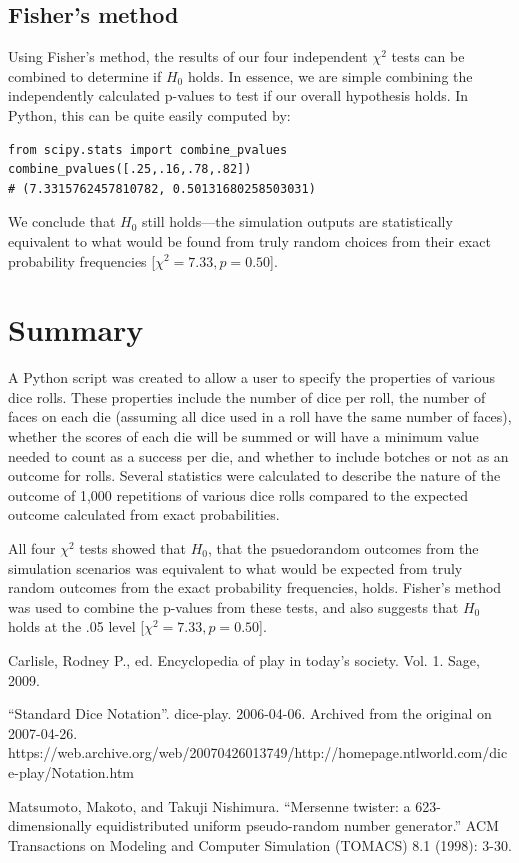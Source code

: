 \documentclass{article}
\begin{document}
\subsection{Fisher's method}

Using Fisher's method, the results of our four independent $\chi^2$ tests can be combined to determine if $H_0$ holds. In essence, we are simple combining the independently calculated p-values to test if our overall hypothesis holds. In Python, this can be quite easily computed by:
\\
\begin{lstlisting}
from scipy.stats import combine_pvalues
combine_pvalues([.25,.16,.78,.82])
# (7.3315762457810782, 0.50131680258503031)
\end{lstlisting}
We conclude that $H_0$ still holds---the simulation outputs are statistically equivalent to what would be found from truly random choices from their exact probability frequencies [$\chi^2=7.33, p=0.50$].

\section{Summary}
A Python script was created to allow a user to specify the properties of various dice rolls. These properties include the number of dice per roll, the number of faces on each die (assuming all dice used in a roll have the same number of faces), whether the scores of each die will be summed or will have a minimum value needed to count as a success per die, and whether to include botches or not as an outcome for rolls. Several statistics were calculated to describe the nature of the outcome of 1,000 repetitions of various dice rolls compared to the expected outcome calculated from exact probabilities.

All four $\chi^2$ tests showed that $H_0$, that the psuedorandom outcomes from the simulation scenarios was equivalent to what would be expected from truly random outcomes from the exact probability frequencies, holds. Fisher's method was used to combine the p-values from these tests, and also suggests that $H_0$ holds at the .05 level [$\chi^2=7.33, p=0.50$].


%
\begin{thebibliography}{1}

Carlisle, Rodney P., ed. Encyclopedia of play in today's society. Vol. 1. Sage, 2009.

``Standard Dice Notation''. dice-play. 2006-04-06. Archived from the original on 2007-04-26. https://web.archive.org/web/20070426013749/http://homepage.ntlworld.com/dice-play/Notation.htm

Matsumoto, Makoto, and Takuji Nishimura. ``Mersenne twister: a 623-dimensionally equidistributed uniform pseudo-random number generator.'' ACM Transactions on Modeling and Computer Simulation (TOMACS) 8.1 (1998): 3-30.

\end{thebibliography}
\end{document}
